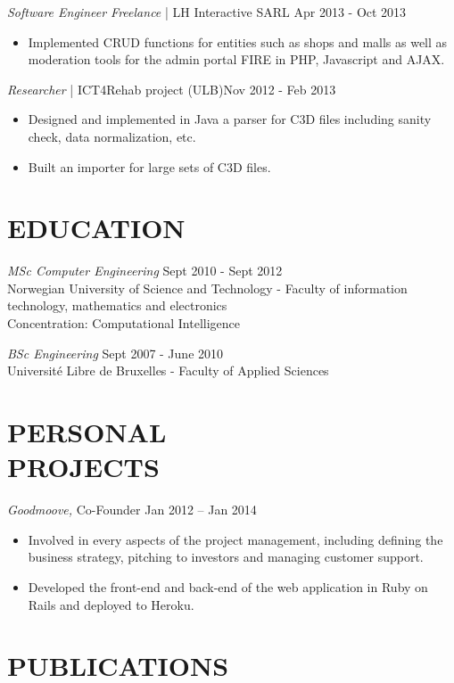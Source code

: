 \documentclass[line, margin]{res}
\begin{document}
\begin{resume}
                {\sl Software Engineer Freelance} | LH Interactive SARL \hfill            Apr 2013 - Oct 2013\\
                 \begin{itemize} %
                  \item Implemented CRUD functions for entities such as shops and malls as well as moderation tools for the admin portal FIRE in PHP, Javascript and AJAX. 
                 \end{itemize} 

                {\sl Researcher} | ICT4Rehab project (ULB)\hfill        Nov 2012 - Feb 2013 \\
                  \begin{itemize}
                   \item Designed and implemented in Java a parser for C3D files including sanity check, data normalization, etc.
                   \item Built an importer for large sets of C3D files.
                  \end{itemize} 

\section{EDUCATION} {\sl MSc Computer Engineering} \hfill   Sept 2010 - Sept 2012 \\
                    Norwegian University of Science and Technology - Faculty of information technology, mathematics and electronics \\
                    Concentration: Computational Intelligence
 
                    {\sl BSc Engineering} \hfill   Sept 2007 - June 2010 \\
                    Université Libre de Bruxelles - Faculty of Applied Sciences
 
 
\section{PERSONAL \\ PROJECTS} {\sl Goodmoove, } Co-Founder \hfill Jan 2012 – Jan 2014\\
                  \begin{itemize} \itemsep -1pt
                   \item Involved in every aspects of the project management, including defining the business strategy,
                     pitching to investors and managing customer support.
                   \item Developed the front-end and back-end of the web application in Ruby on Rails and deployed
                     to Heroku.
                  \end{itemize} 

\section{PUBLICATIONS} 
  \\[5pt]
  \\

\end{resume}
\end{document}
